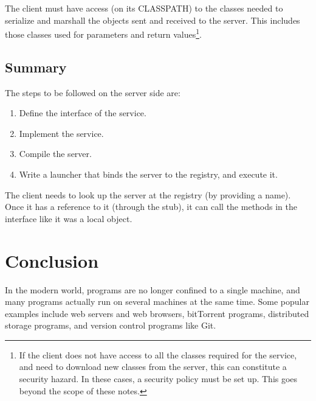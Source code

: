 

The client must have access (on its CLASSPATH) to the classes needed
to serialize and marshall the objects sent and received to the
server. This includes %
those classes used for parameters and return values\footnote{If the
  client does not have access to all the classes required for the
  service, and need to download new classes from the server, this can
  constitute a security hazard. In these cases, a security policy must
  be set up. This goes beyond the scope of these notes.}.

\subsection{Summary}
\label{sec:summary}

The steps to be followed on the server side are: 

\begin{enumerate}
\item Define the interface of the service.
\item Implement the service.
\item Compile the server.
\item Write a launcher that binds the server to the registry, and
  execute it. 
\end{enumerate}

The client needs to look up the server at the registry (by providing a
name). Once it has a reference to it (through the stub), it can call
the methods in the interface like it was a local object. 

\section{Conclusion}
\label{sec:conclusion}

In the modern world, programs are no longer confined to a single
machine, and many programs actually run on several machines at the same
time. Some popular examples include web servers and web browsers,
bitTorrent programs, distributed storage programs, and version control
programs like Git. 


